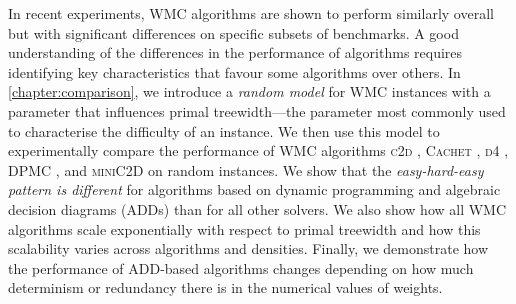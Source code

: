 
In recent experiments, WMC algorithms are shown to perform similarly overall but
with significant differences on specific subsets of benchmarks. A good
understanding of the differences in the performance of algorithms requires
identifying key characteristics that favour some algorithms over others. In
\cref{chapter:comparison}, we introduce a \emph{random model} for WMC instances
with a parameter that influences primal treewidth---the parameter most commonly
used to characterise the difficulty of an instance. We then use this model to
experimentally compare the performance of WMC algorithms \textsc{c2d}
\citep{DBLP:conf/ecai/Darwiche04}, \textsc{Cachet}
\citep{DBLP:conf/sat/SangBBKP04}, \textsc{d4}
\citep{DBLP:conf/ijcai/LagniezM17}, \textsc{DPMC}
\citep{DBLP:conf/cp/DudekPV20}, and \textsc{miniC2D}
\citep{DBLP:conf/ijcai/OztokD15} on random instances. We show that the
\emph{easy-hard-easy pattern is different} for algorithms based on dynamic
programming and algebraic decision diagrams (ADDs) than for all other solvers.
We also show how all WMC algorithms scale exponentially with respect to primal
treewidth and how this scalability varies across algorithms and densities.
Finally, we demonstrate how the performance of ADD-based algorithms changes
depending on how much determinism or redundancy there is in the numerical values
of weights.


